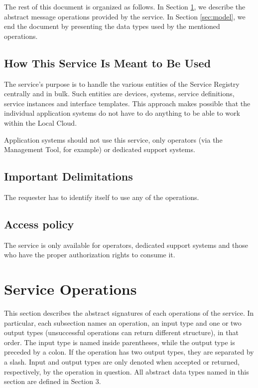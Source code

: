 \documentclass[a4paper]{arrowhead}
\begin{document}
The rest of this document is organized as follows.
In Section \ref{sec:functions}, we describe the abstract message operations provided by the service.
In Section \ref{sec:model}, we end the document by presenting the data types used by the mentioned operations.

\subsection{How This Service Is Meant to Be Used}
The service's purpose is to handle the various entities of the Service Registry centrally and in bulk. Such entities are devices, systems, service definitions, service instances and interface templates. This approach makes possible that the individual application systems do not have to do anything to be able to work within the Local Cloud.

Application systems should not use this service, only operators (via the Management Tool, for example) or dedicated support systems.

\subsection{Important Delimitations}
\label{sec:delimitations}

The requester has to identify itself to use any of the operations.

\subsection{Access policy}
\label{sec:accesspolicy}

The service is only available for operators, dedicated support systems and those who have the proper authorization rights to consume it.

\newpage

\section{Service Operations}
\label{sec:functions}

This section describes the abstract signatures of each operations of the service. 
In particular, each subsection names an operation, an input type and one or two output types (unsuccessful operations can return different structure), in that order.
The input type is named inside parentheses, while the output type is preceded by a colon. If the operation has two output types, they are separated by a slash.
Input and output types are only denoted when accepted or returned, respectively, by the operation in question. All abstract data types named in this section are defined in Section 3.
\end{document}
